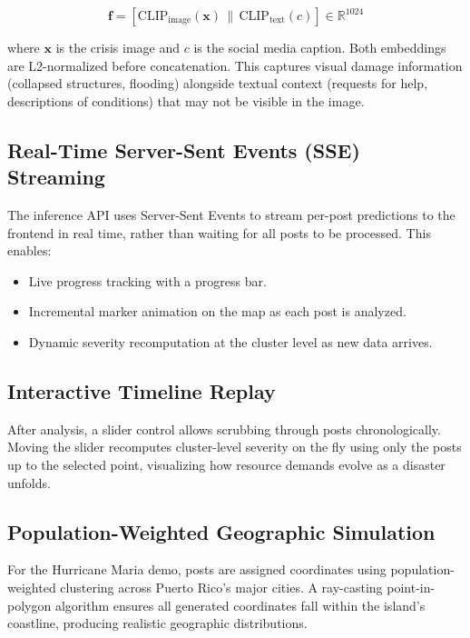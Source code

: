 \documentclass[11pt,a4paper]{article}
\begin{document}
\[
\mathbf{f} = [\text{CLIP}_{\text{image}}(\mathbf{x}) \,\|\, \text{CLIP}_{\text{text}}(c)] \in \mathbb{R}^{1024}
\]

where $\mathbf{x}$ is the crisis image and $c$ is the social media caption. Both embeddings are L2-normalized before concatenation. This captures visual damage information (collapsed structures, flooding) alongside textual context (requests for help, descriptions of conditions) that may not be visible in the image.

\subsection{Real-Time Server-Sent Events (SSE) Streaming}

The inference API uses Server-Sent Events to stream per-post predictions to the frontend in real time, rather than waiting for all posts to be processed. This enables:
\begin{itemize}
    \item Live progress tracking with a progress bar.
    \item Incremental marker animation on the map as each post is analyzed.
    \item Dynamic severity recomputation at the cluster level as new data arrives.
\end{itemize}

\subsection{Interactive Timeline Replay}

After analysis, a slider control allows scrubbing through posts chronologically. Moving the slider recomputes cluster-level severity on the fly using only the posts up to the selected point, visualizing how resource demands evolve as a disaster unfolds.

\subsection{Population-Weighted Geographic Simulation}

For the Hurricane Maria demo, posts are assigned coordinates using population-weighted clustering across Puerto Rico's major cities. A ray-casting point-in-polygon algorithm ensures all generated coordinates fall within the island's coastline, producing realistic geographic distributions.

\newpage
\end{document}
